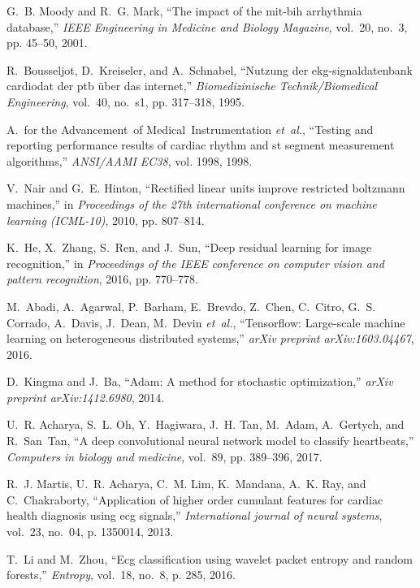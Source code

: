 \documentclass[10pt, conference, compsocconf]{IEEEtran}
\begin{document}
\begin{thebibliography}{10}
	G.~B. Moody and R.~G. Mark, ``The impact of the mit-bih arrhythmia database,''
	\emph{IEEE Engineering in Medicine and Biology Magazine}, vol.~20, no.~3, pp.
	45--50, 2001.
	
	R.~Bousseljot, D.~Kreiseler, and A.~Schnabel, ``Nutzung der ekg-signaldatenbank
	cardiodat der ptb {\"u}ber das internet,'' \emph{Biomedizinische
		Technik/Biomedical Engineering}, vol.~40, no.~s1, pp. 317--318, 1995.
	
	A.~for the Advancement~of Medical~Instrumentation \emph{et~al.}, ``Testing and
	reporting performance results of cardiac rhythm and st segment measurement
	algorithms,'' \emph{ANSI/AAMI EC38}, vol. 1998, 1998.
	
	V.~Nair and G.~E. Hinton, ``Rectified linear units improve restricted boltzmann
	machines,'' in \emph{Proceedings of the 27th international conference on
		machine learning (ICML-10)}, 2010, pp. 807--814.
	
	K.~He, X.~Zhang, S.~Ren, and J.~Sun, ``Deep residual learning for image
	recognition,'' in \emph{Proceedings of the IEEE conference on computer vision
		and pattern recognition}, 2016, pp. 770--778.
	
	M.~Abadi, A.~Agarwal, P.~Barham, E.~Brevdo, Z.~Chen, C.~Citro, G.~S. Corrado,
	A.~Davis, J.~Dean, M.~Devin \emph{et~al.}, ``Tensorflow: Large-scale machine
	learning on heterogeneous distributed systems,'' \emph{arXiv preprint
		arXiv:1603.04467}, 2016.
	
	D.~Kingma and J.~Ba, ``Adam: A method for stochastic optimization,''
	\emph{arXiv preprint arXiv:1412.6980}, 2014.
	
	U.~R. Acharya, S.~L. Oh, Y.~Hagiwara, J.~H. Tan, M.~Adam, A.~Gertych, and
	R.~San~Tan, ``A deep convolutional neural network model to classify
	heartbeats,'' \emph{Computers in biology and medicine}, vol.~89, pp.
	389--396, 2017.
	
	R.~J. Martis, U.~R. Acharya, C.~M. Lim, K.~Mandana, A.~K. Ray, and
	C.~Chakraborty, ``Application of higher order cumulant features for cardiac
	health diagnosis using ecg signals,'' \emph{International journal of neural
		systems}, vol.~23, no.~04, p. 1350014, 2013.
	
	T.~Li and M.~Zhou, ``Ecg classification using wavelet packet entropy and random
	forests,'' \emph{Entropy}, vol.~18, no.~8, p. 285, 2016.
	

\end{thebibliography}
\end{document}
